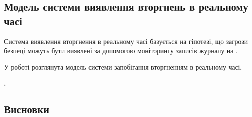 \newpage
{}
\subsection{Модель системи виявлення вторгнень в реальному часі}
    Система виявлення вторгнення в реальному часі базується на гіпотезі, що загрози безпеці можуть бути виявлені за допомогою моніторингу записів журналу на \cite{denning1987intrusion}.

    У роботі  розглянута модель системи запобігання вторгненням в реальному часі.

        \TBD \cite{ben2005outlier}.

\subsection{\TBD}
    \TBD
\newpage
\subsection*{Висновки}
    \TBD
